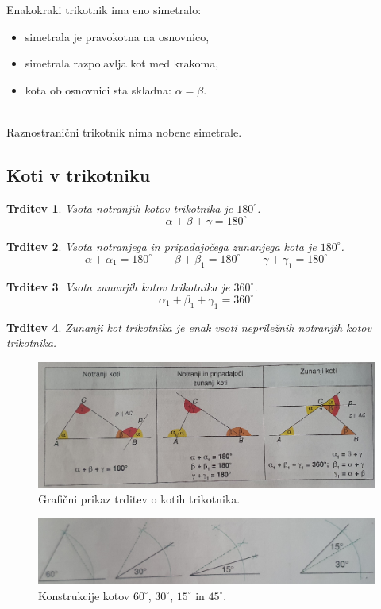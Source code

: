 \documentclass{article}
\newtheorem{trditev}{Trditev}[subsection]
\begin{document}
Enakokraki trikotnik ima eno simetralo:
\begin{itemize}
    \item simetrala je pravokotna na osnovnico,
    \item simetrala razpolavlja kot med krakoma,
    \item kota ob osnovnici sta skladna: $\alpha = \beta$.
\end{itemize}

\ \\
Raznostranični trikotnik nima nobene simetrale.

\pagebreak
\subsection{ Koti v trikotniku }

\begin{trditev}
    Vsota notranjih kotov trikotnika je $180^\circ$.
    \[
        \alpha + \beta + \gamma = 180^\circ
    \]
\end{trditev}

\begin{trditev}
    Vsota notranjega in pripadajočega zunanjega kota je $180^\circ$.
    \[
        \alpha + \alpha_1 = 180^\circ \quad\quad
        \beta + \beta_1 = 180^\circ \quad\quad
        \gamma + \gamma_1 = 180^\circ
    \]
\end{trditev}

\begin{trditev}
    Vsota zunanjih kotov trikotnika je $360^\circ$.
    \[
        \alpha_1 + \beta_1 + \gamma_1 = 360^\circ
    \]
\end{trditev}

\begin{trditev}
    Zunanji kot trikotnika je enak vsoti nepriležnih notranjih kotov trikotnika.
\end{trditev}

\begin{figure}[h]
    \includegraphics[width=\textwidth]{trditveOKotihTrikotnika.png}
    \centering
    \caption{Grafični prikaz trditev o kotih trikotnika.}
\end{figure}
\begin{figure}[h]
    \includegraphics[width=\textwidth]{konstrukcijaKotov.png}
    \centering
    \caption{Konstrukcije kotov $60^\circ$, $30^\circ$, $15^\circ$ in $45^\circ$.}
\end{figure}
\end{document}
